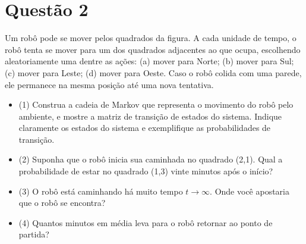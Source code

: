 \section*{Questão 2}

Um robô pode se mover pelos quadrados da figura. A cada unidade de tempo, o robô tenta se mover para um dos quadrados adjacentes ao que ocupa, escolhendo aleatoriamente uma dentre as ações: (a) mover para Norte; (b) mover para Sul; (c) mover para Leste; (d) mover para Oeste. Caso o robô colida com uma parede, ele permanece na mesma posição até uma nova tentativa.

\begin{itemize}
    \item (1) Construa a cadeia de Markov que representa o movimento do robô pelo ambiente, e mostre a matriz de transição de estados do sistema. Indique claramente os estados do sistema e exemplifique as probabilidades de transição.
    \item (2) Suponha que o robô inicia sua caminhada no quadrado (2,1). Qual a probabilidade de estar no quadrado (1,3) vinte minutos após o início?
    \item (3) O robô está caminhando há muito tempo \( t \to \infty \). Onde você apostaria que o robô se encontra?
    \item (4) Quantos minutos em média leva para o robô retornar ao ponto de partida?
\end{itemize}